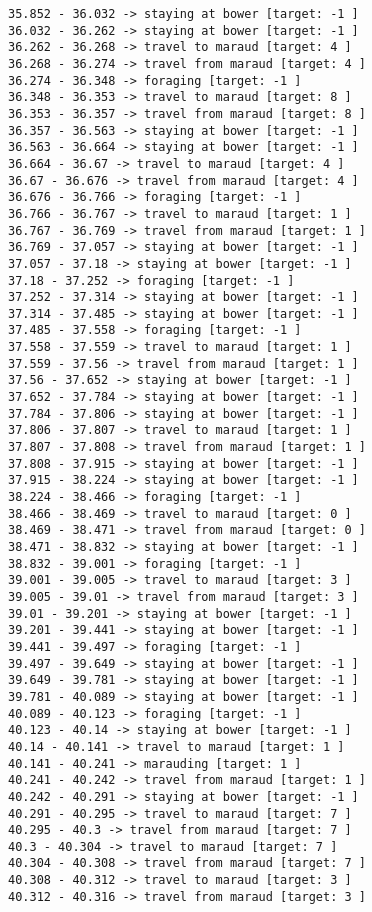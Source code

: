 \documentclass[11pt]{article}
\begin{document}
\begin{Verbatim}[commandchars=\\\{\}]
35.852 - 36.032 -> staying at bower [target: -1 ]
36.032 - 36.262 -> staying at bower [target: -1 ]
36.262 - 36.268 -> travel to maraud [target: 4 ]
36.268 - 36.274 -> travel from maraud [target: 4 ]
36.274 - 36.348 -> foraging [target: -1 ]
36.348 - 36.353 -> travel to maraud [target: 8 ]
36.353 - 36.357 -> travel from maraud [target: 8 ]
36.357 - 36.563 -> staying at bower [target: -1 ]
36.563 - 36.664 -> staying at bower [target: -1 ]
36.664 - 36.67 -> travel to maraud [target: 4 ]
36.67 - 36.676 -> travel from maraud [target: 4 ]
36.676 - 36.766 -> foraging [target: -1 ]
36.766 - 36.767 -> travel to maraud [target: 1 ]
36.767 - 36.769 -> travel from maraud [target: 1 ]
36.769 - 37.057 -> staying at bower [target: -1 ]
37.057 - 37.18 -> staying at bower [target: -1 ]
37.18 - 37.252 -> foraging [target: -1 ]
37.252 - 37.314 -> staying at bower [target: -1 ]
37.314 - 37.485 -> staying at bower [target: -1 ]
37.485 - 37.558 -> foraging [target: -1 ]
37.558 - 37.559 -> travel to maraud [target: 1 ]
37.559 - 37.56 -> travel from maraud [target: 1 ]
37.56 - 37.652 -> staying at bower [target: -1 ]
37.652 - 37.784 -> staying at bower [target: -1 ]
37.784 - 37.806 -> staying at bower [target: -1 ]
37.806 - 37.807 -> travel to maraud [target: 1 ]
37.807 - 37.808 -> travel from maraud [target: 1 ]
37.808 - 37.915 -> staying at bower [target: -1 ]
37.915 - 38.224 -> staying at bower [target: -1 ]
38.224 - 38.466 -> foraging [target: -1 ]
38.466 - 38.469 -> travel to maraud [target: 0 ]
38.469 - 38.471 -> travel from maraud [target: 0 ]
38.471 - 38.832 -> staying at bower [target: -1 ]
38.832 - 39.001 -> foraging [target: -1 ]
39.001 - 39.005 -> travel to maraud [target: 3 ]
39.005 - 39.01 -> travel from maraud [target: 3 ]
39.01 - 39.201 -> staying at bower [target: -1 ]
39.201 - 39.441 -> staying at bower [target: -1 ]
39.441 - 39.497 -> foraging [target: -1 ]
39.497 - 39.649 -> staying at bower [target: -1 ]
39.649 - 39.781 -> staying at bower [target: -1 ]
39.781 - 40.089 -> staying at bower [target: -1 ]
40.089 - 40.123 -> foraging [target: -1 ]
40.123 - 40.14 -> staying at bower [target: -1 ]
40.14 - 40.141 -> travel to maraud [target: 1 ]
40.141 - 40.241 -> marauding [target: 1 ]
40.241 - 40.242 -> travel from maraud [target: 1 ]
40.242 - 40.291 -> staying at bower [target: -1 ]
40.291 - 40.295 -> travel to maraud [target: 7 ]
40.295 - 40.3 -> travel from maraud [target: 7 ]
40.3 - 40.304 -> travel to maraud [target: 7 ]
40.304 - 40.308 -> travel from maraud [target: 7 ]
40.308 - 40.312 -> travel to maraud [target: 3 ]
40.312 - 40.316 -> travel from maraud [target: 3 ]

\end{Verbatim}
\end{document}
